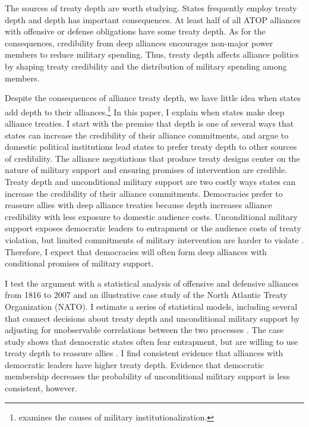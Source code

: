 \documentclass[12pt]{article}
\begin{document}
 
The sources of treaty depth are worth studying. 
States frequently employ treaty depth and depth has important consequences. 
At least half of all ATOP alliances with offensive or defense obligations have some treaty depth.
As for the consequences, credibility from deep alliances encourages non-major power members to reduce military spending.  
Thus, treaty depth affects alliance politics by shaping treaty credibility and the distribution of military spending among members. 


Despite the consequences of alliance treaty depth, we have little idea when states add depth to their alliances.\footnote{\citet{Mattes2012} examines the causes of military institutionalization.}
In this paper, I explain when states make deep alliance treaties.
I start with the premise that depth is one of several ways that states can increase the credibility of their alliance commitments, and argue to domestic political institutions lead states to prefer treaty depth to other sources of credibility. 
The alliance negotiations that produce treaty designs center on the nature of military support \citep{Poast2019a} and ensuring promises of intervention are credible. 
Treaty depth and unconditional military support are two costly ways states can increase the credibility of their alliance commitments.
Democracies prefer to reassure allies with deep alliance treaties because depth increases alliance credibility with less exposure to domestic audience costs. 
Unconditional military support exposes democratic leaders to entrapment or the audience costs of treaty violation, but limited commitments of military intervention are harder to violate \citep{Mattes2012, Chibaetal2015}.
Therefore, I expect that democracies will often form deep alliances with conditional promises of military support. 


I test the argument with a statistical analysis of offensive and defensive alliances from 1816 to 2007 and an illustrative case study of the North Atlantic Treaty Organization (NATO).
I estimate a series of statistical models, including several that connect decisions about treaty depth and unconditional military support by adjusting for unobservable correlations between the two processes \citep{Braumoelleretal2018}. 
The case study shows that democratic states often fear entrapment, but are willing to use treaty depth to reassure allies \citep{SeawrightGerring2008, Seawright2016}. 
I find consistent evidence that alliances with democratic leaders have higher treaty depth.
Evidence that democratic membership decreases the probability of unconditional military support is less consistent, however. 
\end{document}
